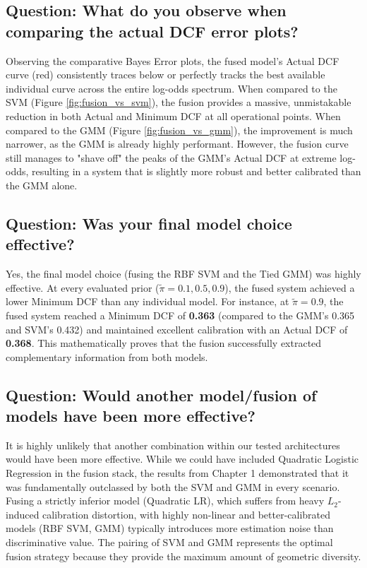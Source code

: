 \subsection*{Question: What do you observe when comparing the actual DCF error plots?}
Observing the comparative Bayes Error plots, the fused model's Actual DCF curve (red) consistently traces below or perfectly tracks the best available individual curve across the entire log-odds spectrum.
When compared to the SVM (Figure \ref{fig:fusion_vs_svm}), the fusion provides a massive, unmistakable reduction in both Actual and Minimum DCF at all operational points. When compared to the GMM (Figure \ref{fig:fusion_vs_gmm}), the improvement is much narrower, as the GMM is already highly performant. However, the fusion curve still manages to "shave off" the peaks of the GMM's Actual DCF at extreme log-odds, resulting in a system that is slightly more robust and better calibrated than the GMM alone.
\subsection*{Question: Was your final model choice effective?}
Yes, the final model choice (fusing the RBF SVM and the Tied GMM) was highly effective. At every evaluated prior ($\tilde{\pi}=0.1, 0.5, 0.9$), the fused system achieved a lower Minimum DCF than any individual model. For instance, at $\tilde{\pi}=0.9$, the fused system reached a Minimum DCF of \textbf{0.363} (compared to the GMM's 0.365 and SVM's 0.432) and maintained excellent calibration with an Actual DCF of \textbf{0.368}. This mathematically proves that the fusion successfully extracted complementary information from both models.
\subsection*{Question: Would another model/fusion of models have been more effective?}
It is highly unlikely that another combination within our tested architectures would have been more effective. While we could have included Quadratic Logistic Regression in the fusion stack, the results from Chapter 1 demonstrated that it was fundamentally outclassed by both the SVM and GMM in every scenario. Fusing a strictly inferior model (Quadratic LR), which suffers from heavy $L_2$-induced calibration distortion, with highly non-linear and better-calibrated models (RBF SVM, GMM) typically introduces more estimation noise than discriminative value. The pairing of SVM and GMM represents the optimal fusion strategy because they provide the maximum amount of geometric diversity.
